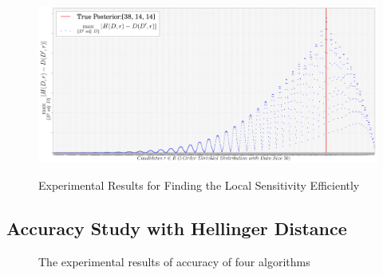  \begin{figure}[h]
\centering
\includegraphics[width=1.0\textwidth]{efficiency}
\label{fig_efficiency}
\caption{Experimental Results for Finding the Local Sensitivity Efficiently}
\end{figure}

\subsection{Accuracy Study with Hellinger Distance}
\begin{figure}
\begin{center}
\centering
\caption{The experimental results of accuracy of four algorithms}
\label{fig_data}
\end{center}
\end{figure}

